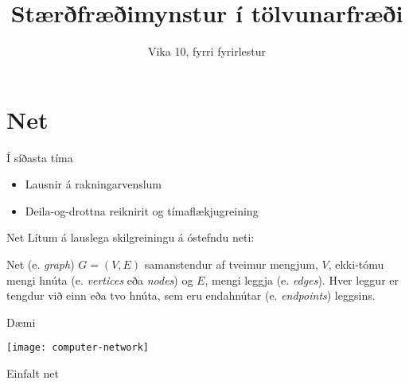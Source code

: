 \documentclass{beamer}
\title{Stærðfræðimynstur í tölvunarfræði}
\subtitle{Vika 10, fyrri fyrirlestur}
\begin{document}
\begin{frame}
\titlepage
\end{frame}


\section{Net}

\begin{frame}{Í síðasta tíma}
    \begin{itemize}
     \item Lausnir á rakningarvenslum
     \item Deila-og-drottna reiknirit og tímaflækjugreining
    \end{itemize}
\end{frame}

\begin{frame}{Net}
Lítum á lauslega skilgreiningu á óstefndu neti:

\begin{tcolorbox}[title=Net]
Net (e. \emph{graph}) $G = (V, E)$ samanstendur af tveimur mengjum, $V$, ekki-tómu mengi hnúta (e. \emph{vertices} eða \emph{nodes}) og $E$, mengi leggja (e. \emph{edges}). Hver leggur er tengdur við einn eða tvo hnúta, sem eru endahnútar (e. \emph{endpoints}) leggsins.
\end{tcolorbox}
\end{frame}

\begin{frame}{Dæmi}
\begin{center}
\texttt{[image: computer-network]}

Einfalt net
\end{center}
\end{frame}
\end{document}
